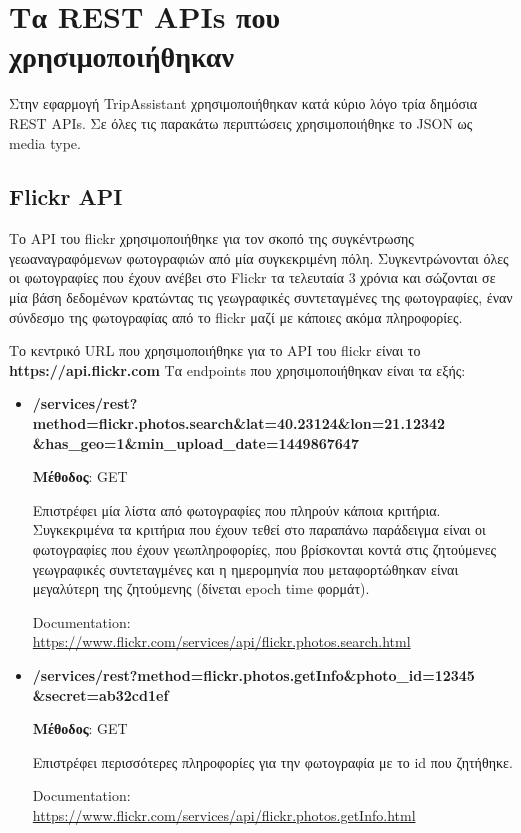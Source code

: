 \documentclass[oneside, 12pt]{book}
\begin{document}
\section{Τα REST APIs που χρησιμοποιήθηκαν}
Στην εφαρμογή TripAssistant χρησιμοποιήθηκαν κατά κύριο λόγο τρία 
δημόσια REST APIs.
Σε όλες τις παρακάτω περιπτώσεις χρησιμοποιήθηκε το JSON ως media type.

\subsection{Flickr API}
Το API του flickr χρησιμοποιήθηκε για τον σκοπό της συγκέντρωσης 
γεωαναγραφόμενων φωτογραφιών από μία συγκεκριμένη πόλη.
Συγκεντρώνονται όλες οι φωτογραφίες που έχουν ανέβει στο Flickr τα 
τελευταία 3 χρόνια και σώζονται σε μία βάση δεδομένων κρατώντας τις 
γεωγραφικές συντεταγμένες της φωτογραφίες, έναν σύνδεσμο της 
φωτογραφίας από το flickr μαζί με κάποιες ακόμα πληροφορίες.

Το κεντρικό URL που χρησιμοποιήθηκε για το 
API του flickr είναι το \textbf{https://api.flickr.com} 
Τα endpoints που χρησιμοποιήθηκαν είναι τα εξής:
\begin{itemize}
    \item \textbf{/services/rest?method=flickr.photos.search\&lat=40.23124\&lon=21.12342\\\&has\_geo=1\&min\_upload\_date=1449867647}
    
    \textbf{Μέθοδος}: GET
    
    Επιστρέφει μία λίστα από φωτογραφίες που πληρούν κάποια κριτήρια.
    Συγκεκριμένα τα κριτήρια που έχουν τεθεί στο παραπάνω παράδειγμα 
    είναι οι φωτογραφίες που έχουν γεωπληροφορίες, που βρίσκονται 
    κοντά στις ζητούμενες γεωγραφικές συντεταγμένες και η ημερομηνία 
    που μεταφορτώθηκαν είναι μεγαλύτερη της ζητούμενης (δίνεται epoch time φορμάτ).
    
    Documentation: \url{https://www.flickr.com/services/api/flickr.photos.search.html}
    \item \textbf{/services/rest?method=flickr.photos.getInfo\&photo\_id=12345\\\&secret=ab32cd1ef}
    
    \textbf{Μέθοδος}: GET
    
    Επιστρέφει περισσότερες πληροφορίες για την φωτογραφία με 
    το id που ζητήθηκε.
    
    Documentation: \url{https://www.flickr.com/services/api/flickr.photos.getInfo.html}
\end{itemize}
\end{document}
